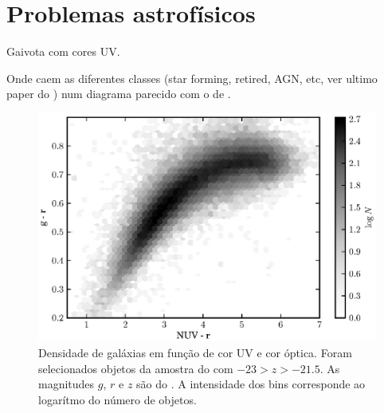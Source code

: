 



\chapter{Problemas astrofísicos}
\label{sec:Problemas}

Gaivota com cores UV.

Onde caem as diferentes classes (star forming, retired, AGN, etc, ver ultimo
paper do \citet{CidFernandes2011}) num diagrama parecido com o de
\citet{Chilingarian2011}.

\begin{figure}
	\includegraphics{figuras/uvcolor-color-density.eps}
	\caption[Densidade de galáxias no diagrama cor--cor UV.]
	{Densidade de galáxias em função de cor UV e cor óptica. Foram selecionados
	objetos da amostra do \starlight com $-23 > z > -21.5$. As magnitudes $g$, $r$
	e $z$ são do \SDSS. A intensidade dos bins corresponde ao logarítmo do número
	de objetos.}
	\label{fig:DensityColor}
\end{figure}

